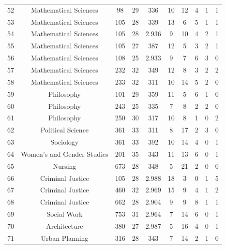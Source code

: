 \documentclass[12pt,letterpaper,oneside,openany]{book}
\begin{document}
\begin{center}
\begin{longtable}{c||ccccccccc}
		52 & Mathematical Sciences           & 98    & 29                & 336 & 10 & 12 & 4 & 1 & 1 \\
		53 & Mathematical Sciences           & 105   & 28                & 339 & 13 & 6  & 5 & 1 & 1 \\
		54 & Mathematical Sciences           & 105   & 28                & 2.936 & 9  & 10 & 4 & 2 & 1 \\
		55 & Mathematical Sciences           & 105   & 27                & 387 & 12 & 5  & 3 & 2 & 1 \\
		56 & Mathematical Sciences           & 108   & 25                & 2.933 & 9  & 7  & 6 & 3 & 0 \\
		57 & Mathematical Sciences           & 232   & 32                & 349 & 12 & 8  & 3 & 2 & 2 \\
		58 & Mathematical Sciences           & 233   & 32                & 311 & 10 & 14 & 5 & 2 & 0 \\
		59 & Philosophy                      & 101   & 29                & 359 & 11 & 5  & 6 & 1 & 0 \\
		60 & Philosophy                      & 243   & 25                & 335 & 7  & 8  & 2 & 2 & 0 \\
		61 & Philosophy                      & 250   & 30                & 317 & 10 & 8  & 1 & 0 & 2 \\
		62 & Political Science               & 361   & 33                & 311 & 8  & 17 & 2 & 3 & 0 \\
		63 & Sociology                       & 361   & 33                & 392 & 10 & 14 & 4 & 0 & 1 \\
		64 & Women's and Gender Studies      & 201   & 35                & 343 & 11 & 13 & 6 & 0 & 1 \\
		65 & Nursing                         & 673   & 28                & 348 & 5  & 21 & 2 & 0 & 0 \\
		66 & Criminal Justice                & 105   & 28                & 2.988 & 18 & 3  & 0 & 1 & 5 \\
		67 & Criminal Justice                & 460   & 32                & 2.969 & 15 & 9  & 4 & 1 & 2 \\
		68 & Criminal Justice                & 662   & 28                & 2.904 & 9  & 9  & 8 & 1 & 1 \\
		69 & Social Work                     & 753   & 31                & 2.964 & 7  & 14 & 6 & 0 & 1 \\
		70 & Architecture                    & 380   & 27                & 2.987 & 5  & 16 & 4 & 0 & 1 \\
		71 & Urban Planning                  & 316   & 28                & 343 & 7  & 14 & 2 & 1 & 0
	\end{longtable}
\end{center}
\end{document}
